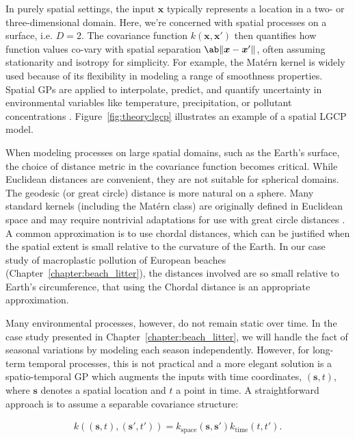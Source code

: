 In purely spatial settings, the input $\bm{x}$ typically represents a location in a two- or three-dimensional domain. Here, we're concerned with spatial processes on a surface, i.e. $D=2$. The covariance function $k(\bm{x},\bm{x}')$ then quantifies how function values co-vary with spatial separation $\ab \| \bm{x} - \bm{x}' \|$, often assuming stationarity and isotropy for simplicity. For example, the Matérn kernel is widely used because of its flexibility in modeling a range of smoothness properties. Spatial GPs are applied to interpolate, predict, and quantify uncertainty in environmental variables like temperature, precipitation, or pollutant concentrations \cite[e.g][]{datta_nonseparable_2016,wang_use_2020}. Figure~\ref{fig:theory:lgcp} illustrates an example of a spatial LGCP model.

When modeling processes on large spatial domains, such as the Earth's surface, the choice of distance metric in the covariance function becomes critical. While Euclidean distances are convenient, they are not suitable for spherical domains. The geodesic (or great circle) distance is more natural on a sphere. Many standard kernels (including the Matérn class) are originally defined in Euclidean space and may require nontrivial adaptations for use with great circle distances \cite{jeong_spherical_2017,blake_parametric_2022,borovitskiy_matern_2023}. A common approximation is to use chordal distances, which can be justified when the spatial extent is small relative to the curvature of the Earth. In our case study of macroplastic pollution of European beaches (Chapter~\ref{chapter:beach_litter}), the distances involved are so small relative to Earth's circumference, that using the Chordal distance is an appropriate approximation. 

Many environmental processes, however, do not remain static over time. In the case study presented in Chapter~\ref{chapter:beach_litter}, we will handle the fact of seasonal variations by modeling each season independently. However, for long-term temporal processes, this is not practical and a more elegant solution is a spatio-temporal GP which augments the inputs with time coordinates, $(\bm{s}, t)$, where $\bm{s}$ denotes a spatial location and $t$ a point in time. A straightforward approach is to assume a separable covariance structure:

\begin{align}
    k((\bm{s},t),(\bm{s}',t')) = k_{\text{space}}(\bm{s},\bm{s}')k_{\text{time}}(t,t').
\end{align}

